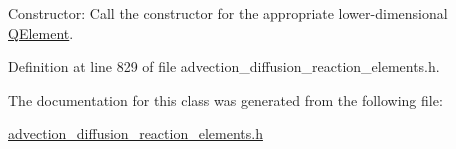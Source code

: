 Constructor\+: Call the constructor for the appropriate lower-\/dimensional \hyperlink{classoomph_1_1QElement}{Q\+Element}. 



Definition at line 829 of file advection\+\_\+diffusion\+\_\+reaction\+\_\+elements.\+h.



The documentation for this class was generated from the following file\+:\begin{DoxyCompactItemize}
\item 
\hyperlink{advection__diffusion__reaction__elements_8h}{advection\+\_\+diffusion\+\_\+reaction\+\_\+elements.\+h}\end{DoxyCompactItemize}
